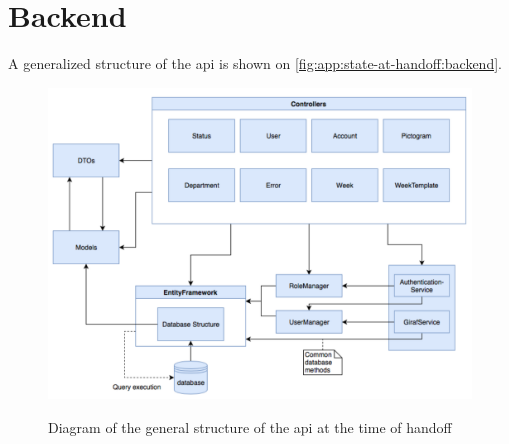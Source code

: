 \section{Backend}\label{app:state-at-handoff:backend}

A generalized structure of the \gls{api} is shown on \autoref{fig:app:state-at-handoff:backend}.

\begin{figure}[h]
    \centering
    \caption{Diagram of the general structure of the \gls{api} at the time of handoff}
    \includegraphics[width=1\textwidth]{figures/api_gen_struct_ho.png}
    \label{fig:app:state-at-handoff:backend}
\end{figure}
